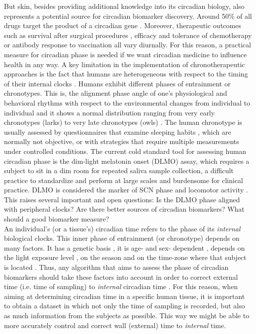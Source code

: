 But skin, besides providing additional knowledge into its circadian biology, also represents a potential source for circadian biomarker discovery. Around 50\% of all drugs target the product of a circadian gene \cite{Anafi2017}. Moreover, therapeutic outcomes such as survival after surgical procedures \cite{Montaigne2018}, efficacy and tolerance of chemotherapy \cite{Dallmann2016} or antibody response to vaccination \cite{Long2016} all vary diurnally. For this reason, a practical measure for circadian phase is needed if we want circadian medicine to influence health in any way. A key limitation in the implementation of chronotherapeutic approaches is the fact that humans are heterogeneous with respect to the timing of their internal clocks \cite{Roenneberg2007}. Humans exhibit different phases of entrainment or chronotypes. This is, the alignment phase angle of one's physiological and behavioral rhythms with respect to the environmental changes from individual to individual and it shows a normal distribution ranging from very early chronotypes (larks) to very late chronotypes (owls) \cite{Roenneberg2007}. The human chronotype is usually assessed by questionnaires that examine sleeping habits \cite{Horne1976, Roenneberg2003}, which are normally not objective, or with strategies that require multiple measurements under controlled conditions. The current cold standard tool for assessing human circadian phase is the dim-light melatonin onset (DLMO) assay, which requires a subject to sit in a dim room for repeated saliva sample collection, a difficult practice to standardize and perform at large scales and burdensome for clinical practice. DLMO is considered the marker of SCN phase and locomotor activity \cite{Pandi2007, Laing2017}. This raises several important and open questions: Is the DLMO phase aligned with peripheral clocks? Are there better sources of circadian biomarkers? What should a good biomarker measure? \\

An individual's (or a tissue's) circadian time refers to the phase of its \textit{internal }biological clocks. This inner phase of entrainment (or chronotype) depends on many factors. It has a genetic basis \cite{Hsu2015, Brown2008}, it is age- and sex- dependent \cite{Roenneberg2007}, depends on the light exposure level \cite{Stothard2017, Wright2013}, on the season \cite{Stothard2017, Allebrandt2014} and on the time-zone where that subject is located \cite{Roenneberg2007}. Thus, any algorithm that aims to assess the phase of circadian biomarkers should take these factors into account in order to correct external time (i.e. time of sampling) to \textit{internal} circadian time \cite{Laing2019}. For this reason, when aiming at determining circadian time in a specific human tissue, it is important to obtain a dataset in which not only the time of sampling is recorded, but also as much information from the subjects as possible. This way we might be able to more accurately control and correct wall (external) time to \textit{internal }time. \\


